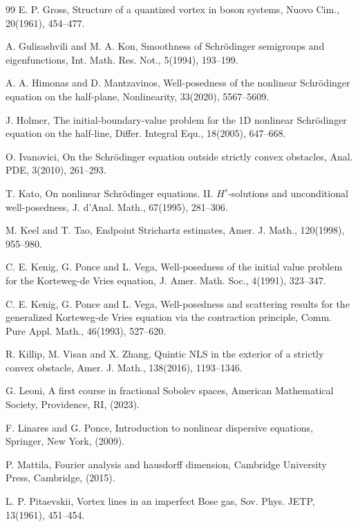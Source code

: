 \documentclass[preprint,compress,12pt]{elsarticle}
\numberwithin{equation}{section}
\begin{document}
\begin{thebibliography}{99}
	E. P. Gross, Structure of a quantized vortex in boson systems, Nuovo Cim., 20(1961), 454--477.
	
	A. Gulisashvili and M. A. Kon, Smoothness of Schr\"{o}dinger semigroups and eigenfunctions, Int. Math. Res. Not., 5(1994), 193--199.
	
	A. A. Himonas and D. Mantzavinos, Well-posedness of the nonlinear Schr\"{o}dinger equation on the half-plane, Nonlinearity, 33(2020), 5567--5609.
	
	J. Holmer, The initial-boundary-value problem for the 1D nonlinear Schr\"{o}dinger equation on the half-line, Differ. Integral Equ., 18(2005), 647--668.
	
	O. Ivanovici, On the Schr\"{o}dinger equation outside strictly convex obstacles, Anal. PDE, 3(2010), 261--293.
	
	T. Kato, On nonlinear Schr\"{o}dinger equations. II. $H^{s}$-solutions and unconditional well-posedness, J. d'Anal. Math., 67(1995), 281--306.
	
	M. Keel and T. Tao, Endpoint Strichartz estimates, Amer. J. Math., 120(1998), 955--980.
	
	C. E. Kenig, G. Ponce and L. Vega, Well-posedness of the initial value problem for the Korteweg-de Vries equation, J. Amer. Math. Soc., 4(1991), 323--347.
	
	C. E. Kenig, G. Ponce and L. Vega, Well-posedness and scattering results for the generalized Korteweg-de Vries equation via the contraction principle, Comm. Pure Appl. Math., 46(1993), 527--620.
	
	R. Killip, M. Visan and X. Zhang, Quintic NLS in the exterior of a strictly convex obstacle, Amer. J. Math., 138(2016), 1193--1346.
	
	
	G. Leoni, A first course in fractional Sobolev spaces, American Mathematical Society, Providence, RI, (2023).
	
	F. Linares and G. Ponce, Introduction to nonlinear dispersive equations, Springer, New York, (2009).
	
	P. Mattila, Fourier analysis and hausdorff dimension, Cambridge University Press, Cambridge, (2015).
	
	
	
	
	L. P. Pitaevskii, Vortex lines in an imperfect Bose gas, Sov. Phys. JETP, 13(1961), 451--454.
	

\end{thebibliography}
\end{document}
